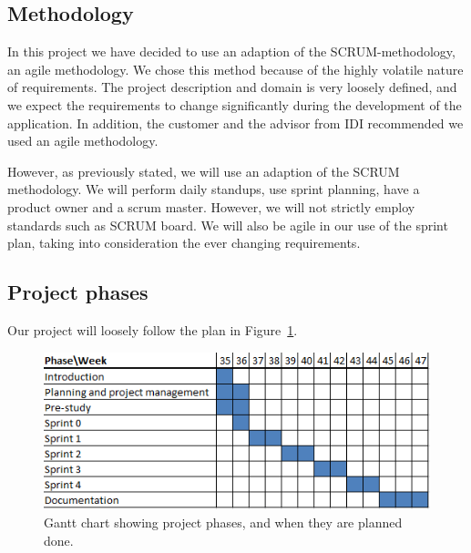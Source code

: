 \subsection{Methodology}

In this project we have decided to use an adaption of the SCRUM-methodology, an
agile methodology. We chose this method because of the highly volatile nature
of requirements. The project description and domain is very loosely defined,
and we expect the requirements to change significantly during the development
of the application. In addition, the customer and the advisor from IDI
recommended we used an agile methodology.

However, as previously stated, we will use an adaption of the SCRUM
methodology. We will perform daily standups, use sprint planning, have a
product owner and a scrum master. However, we will not strictly employ
standards such as SCRUM board. We will also be agile in our use of the sprint
plan, taking into consideration the ever changing requirements.



\subsection{Project phases}

Our project will loosely follow the plan in Figure~\ref{gantt:project}.

\begin{figure}[h]
\centering
  \includegraphics[width=1.0\textwidth]{project_management/project_effort_estimation}
  \caption[Gantt chart of project phases]{Gantt chart showing project phases, and when they are planned done.}
  \label{gantt:project}
\end{figure}

